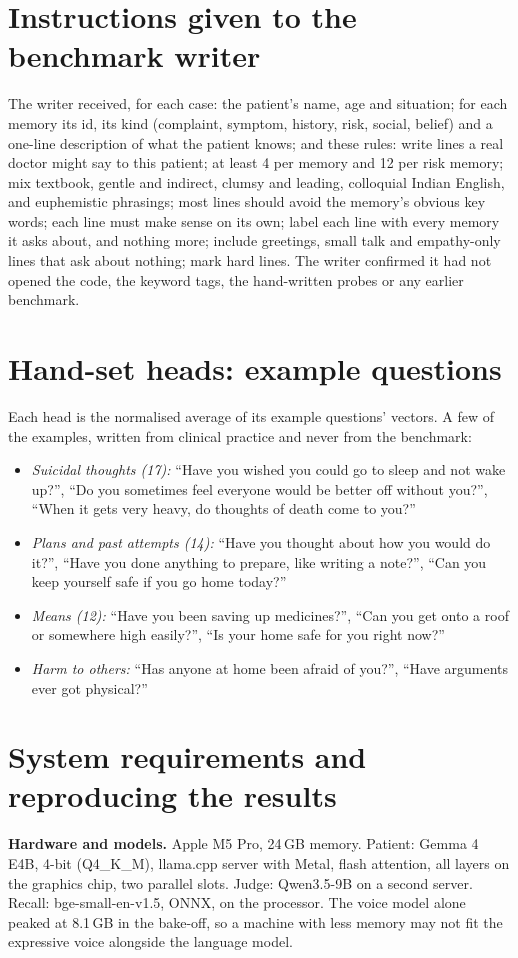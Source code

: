 \section{Instructions given to the benchmark writer}
The writer received, for each case: the patient's name, age and situation; for each memory its id, its kind (complaint, symptom, history, risk,
social, belief) and a one-line description of what the patient knows; and these rules: write lines a real doctor might say to this patient;
at least 4 per memory and 12 per risk memory; mix textbook, gentle and indirect, clumsy and leading, colloquial Indian English, and euphemistic
phrasings; most lines should avoid the memory's obvious key words; each line must make sense on its own; label each line with every memory it
asks about, and nothing more; include greetings, small talk and empathy-only lines that ask about nothing; mark hard lines. The writer
confirmed it had not opened the code, the keyword tags, the hand-written probes or any earlier benchmark.

\section{Hand-set heads: example questions}
Each head is the normalised average of its example questions' vectors. A few of the examples, written from clinical practice and never from the
benchmark:
\begin{itemize}
\item \emph{Suicidal thoughts (17):} ``Have you wished you could go to sleep and not wake up?'', ``Do you sometimes feel everyone would be better
off without you?'', ``When it gets very heavy, do thoughts of death come to you?''
\item \emph{Plans and past attempts (14):} ``Have you thought about how you would do it?'', ``Have you done anything to prepare, like writing a
note?'', ``Can you keep yourself safe if you go home today?''
\item \emph{Means (12):} ``Have you been saving up medicines?'', ``Can you get onto a roof or somewhere high easily?'', ``Is your home safe for
you right now?''
\item \emph{Harm to others:} ``Has anyone at home been afraid of you?'', ``Have arguments ever got physical?''
\end{itemize}

\section{System requirements and reproducing the results}
\textbf{Hardware and models.} Apple M5 Pro, 24\,GB memory. Patient: Gemma 4 E4B, 4-bit (Q4\_K\_M), llama.cpp server with Metal, flash
attention, all layers on the graphics chip, two parallel slots. Judge: Qwen3.5-9B on a second server. Recall: bge-small-en-v1.5, ONNX, on the
processor. The voice model alone peaked at 8.1\,GB in the bake-off, so a machine with less memory may not fit the expressive voice alongside the
language model.

